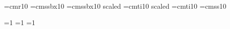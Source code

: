 
\font\mainfont=cmr10
\font\chheadfont=cmssbx10
\font\bkheadfont=cmssbx10 scaled 
\font\titlefont=cmti10 scaled 
\font\emphfont=cmti10
\font\itheading=cmss10

=1
=1
=1

\def\ejtoodd#1{\ifodd\count0\null\break\eject\null\break\eject\else\null\break\eject\fi}

\def\title#1{\centerline{\titlefont #1}\vskip 26pt \centerline{\bkheadfont \versionname}\eject}

\def\version#1{\def\versionname{The #1 Version}}

\def\testament#1{\ejtoodd\rightline{\titlefont The #1 Testament}\eject\count12=1\count0=0}

\def\book#1{\null\eject\advance\count12 by 1{\bkheadfont \number\count12\ #1\break}\count10=1\count11=1}

\def\chapter{{\chheadfont \number\count10}\count11=1\advance\count10 by 1}

\def\verse{$ ^{\number\count11} $\advance\count11 by 1}

\def\emph#1{{\emphfont #1}}

\def\ithead#1{\break\centerline{\itheading #1}\break}
